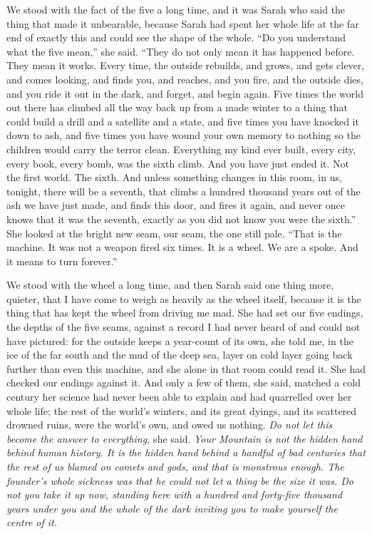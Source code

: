 We stood with the fact of the five a long time, and it was Sarah who said the thing that made it unbearable, because Sarah had spent her whole life at the far end of exactly this and could see the shape of the whole. ``Do you understand what the five mean,'' she said. ``They do not only mean it has happened before. They mean it works. Every time, the outside rebuilds, and grows, and gets clever, and comes looking, and finds you, and reaches, and you fire, and the outside dies, and you ride it out in the dark, and forget, and begin again. Five times the world out there has climbed all the way back up from a made winter to a thing that could build a drill and a satellite and a state, and five times you have knocked it down to ash, and five times you have wound your own memory to nothing so the children would carry the terror clean. Everything my kind ever built, every city, every book, every bomb, was the sixth climb. And you have just ended it. Not the first world. The sixth. And unless something changes in this room, in us, tonight, there will be a seventh, that climbs a hundred thousand years out of the ash we have just made, and finds this door, and fires it again, and never once knows that it was the seventh, exactly as you did not know you were the sixth.'' She looked at the bright new seam, our seam, the one still pale. ``That is the machine. It was not a weapon fired six times. It is a wheel. We are a spoke. And it means to turn forever.''\par

We stood with the wheel a long time, and then Sarah said one thing more, quieter, that I have come to weigh as heavily as the wheel itself, because it is the thing that has kept the wheel from driving me mad. She had set our five endings, the depths of the five seams, against a record I had never heard of and could not have pictured: for the outside keeps a year-count of its own, she told me, in the ice of the far south and the mud of the deep sea, layer on cold layer going back further than even this machine, and she alone in that room could read it. She had checked our endings against it. And only a few of them, she said, matched a cold century her science had never been able to explain and had quarrelled over her whole life; the rest of the world's winters, and its great dyings, and its scattered drowned ruins, were the world's own, and owed us nothing. \emph{Do not let this become the answer to everything,} she said. \emph{Your Mountain is not the hidden hand behind human history. It is the hidden hand behind a handful of bad centuries that the rest of us blamed on comets and gods, and that is monstrous enough. The founder's whole sickness was that he could not let a thing be the size it was. Do not you take it up now, standing here with a hundred and forty-five thousand years under you and the whole of the dark inviting you to make yourself the centre of it.}\par

